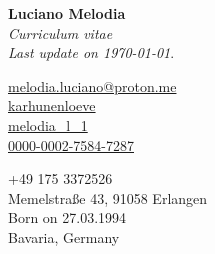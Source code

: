 \documentclass[a4paper,11pt]{article}
\begin{document}
{
  {
  \Huge \textbf{Luciano Melodia}}\\[0.1cm]
  \emph{Curriculum vitae}\\
  \emph{Last update on \today}.

  \begin{flushleft}
    \scriptsize
      \begin{minipage}{0.3\textwidth}
        {\footnotesize \faEnvelope} \hspace{0.1cm} \href{mailto:melodia.luciano@proton.me}{melodia.luciano@proton.me}\\[0.05cm]
        {\footnotesize \faGithub} \hspace{0.15cm} \href{https://github.com/karhunenloeve}{karhunenloeve}\\[0.05cm]
        {\footnotesize \aiarXiv} \hspace{0.1cm} \href{https://arxiv.org/a/melodia_l_1}{melodia\_l\_1}\\[0.05cm]
        {\footnotesize \aiOrcid} \hspace{0.1cm} \href{https://orcid.org/0000-0002-7584-7287}{0000-0002-7584-7287}
      \end{minipage}
      \begin{minipage}{0.4\textwidth}
        {\footnotesize \faPhone} \hspace{0.15cm} +49 175 3372526 \\[0.05cm]
        {\footnotesize \faMapPin} \hspace{0.23cm} Memelstraße 43, 91058 Erlangen\\[0.05cm]
        {\footnotesize \faMars} \hspace{0.1cm} Born on 27.03.1994\\[0.05cm]
        {\footnotesize \faMapO} \hspace{0.1cm} Bavaria, Germany
      \end{minipage}
  \end{flushleft}
}

\end{document}
